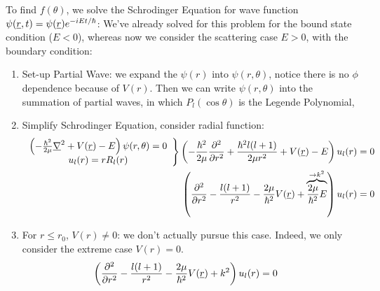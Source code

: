 \documentclass{school-22.101-notes}
\begin{document}
To find $f(\theta)$, we solve the Schrodinger Equation for wave function $\psi(\underline{r}, t) = \psi(\underline{r}) e^{-iEt/\hbar}$:
We've already solved for this problem for the bound state condition ($E <0$), whereas now we consider the scattering case $E>0$, with the boundary condition:

\begin{enumerate}
\item Set-up Partial Wave: we expand the $\psi(r)$ into $\psi(r, \theta)$, notice there is no $\phi$ dependence because of $V(r)$. Then we can write $\psi(r,\theta)$ into the summation of partial waves, in which $P_l (\cos \theta)$ is the Legende Polynomial, 

\item Simplify Schrodinger Equation, consider radial function: 
\begin{align}
\left. \begin{array}{c}
\left(- \frac{\hbar^2}{2 \mu} \underline{\nabla}^2 + V(\underline{r}) - E  \right) \psi(r,\theta) = 0 \\
u_l (r) = r R_l (r) 
\end{array} \right\} 
\left( -\frac{\hbar^2}{2 \mu} \frac{\partial^{2} }{\partial r ^{2}} +\frac{\hbar^2 l(l+1)}{2 \mu r^2} + V(\underline{r}) - E  \right) u_l (r) &= 0 \\
\left( \frac{\partial^{2} }{\partial r ^{2}} - \frac{l(l+1)}{r^2} - \frac{2\mu}{\hbar^2} V(\underline{r}) + \overbrace{\frac{2\mu}{\hbar^2} E}^{\to k^2}  \right) u_l (r) &= 0 
\end{align}

\item For $r\le r_0$, $V(r) \neq 0$: we don't actually pursue this case. Indeed, we only consider the extreme case $V (r) =0$. 
\begin{align}
\left( \frac{\partial^{2} }{\partial r ^{2}} - \frac{l(l+1)}{r^2} - \frac{2\mu}{\hbar^2} V(\underline{r}) + k^2  \right) u_l (r) &= 0 
\end{align}


\end{enumerate}
\end{document}
